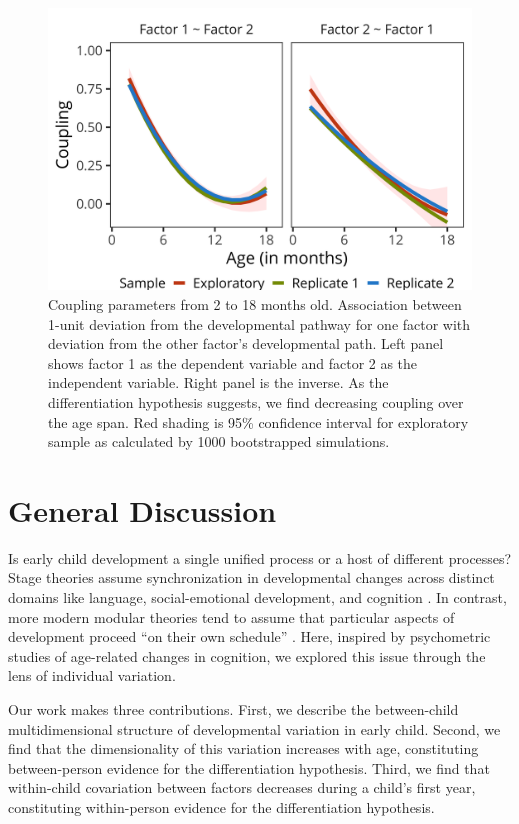 \documentclass[man, floatsintext]{apa7}
\begin{document}
\begin{figure}
\centering
\includegraphics[width=.75\columnwidth]{figures/study2results.png}
\caption{Coupling parameters from 2 to 18 months old. Association between 1-unit deviation from the developmental pathway for one factor with deviation from the other factor’s developmental path. Left panel shows factor 1 as the dependent variable and factor 2 as the independent variable. Right panel is the inverse. As the differentiation hypothesis suggests, we find decreasing coupling over the age span. Red shading is 95\% confidence interval for exploratory sample as calculated by 1000 bootstrapped simulations.}
\label{fig:study2results}
\end{figure}

\section{General Discussion}

Is early child development a single uniﬁed process or a host of different
processes? Stage theories assume synchronization in developmental
changes across distinct domains like language, social-emotional
development, and cognition \parencite{flavell1963}. In contrast, more modern modular theories
tend to assume that particular aspects of development proceed ``on their
own schedule'' \parencite{spelke1992,sheldrick2019}. Here, inspired by psychometric studies of
age-related changes in cognition, we explored this issue through the lens of individual variation.


Our work makes three contributions.
First, we describe the between-child multidimensional structure of
developmental variation in early child. Second, we find that the
dimensionality of this variation increases with age, constituting between-person evidence for the differentiation hypothesis. Third, we find that
within-child covariation between factors decreases during a child's
first year, constituting within-person evidence for the differentiation hypothesis.
\end{document}
